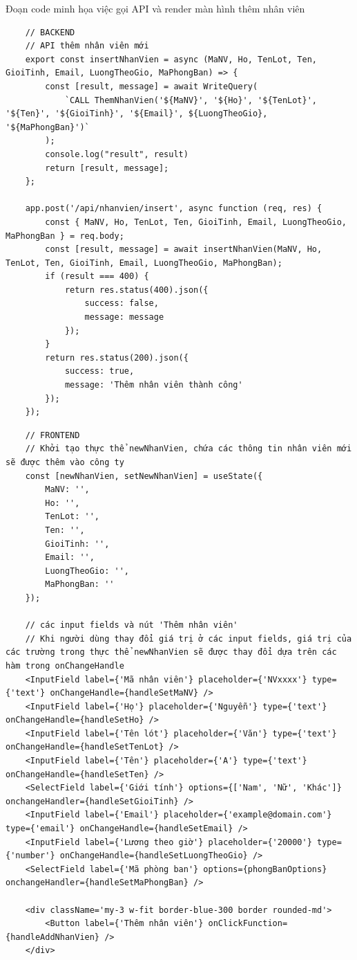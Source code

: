 \newpage
Đoạn code minh họa việc gọi API và render màn hình thêm nhân viên
\begin{verbatim}
    // BACKEND
    // API thêm nhân viên mới
    export const insertNhanVien = async (MaNV, Ho, TenLot, Ten, GioiTinh, Email, LuongTheoGio, MaPhongBan) => {
        const [result, message] = await WriteQuery(
            `CALL ThemNhanVien('${MaNV}', '${Ho}', '${TenLot}', '${Ten}', '${GioiTinh}', '${Email}', ${LuongTheoGio}, '${MaPhongBan}')`
        );
        console.log("result", result)
        return [result, message];
    };

    app.post('/api/nhanvien/insert', async function (req, res) {
        const { MaNV, Ho, TenLot, Ten, GioiTinh, Email, LuongTheoGio, MaPhongBan } = req.body;
        const [result, message] = await insertNhanVien(MaNV, Ho, TenLot, Ten, GioiTinh, Email, LuongTheoGio, MaPhongBan);
        if (result === 400) {
            return res.status(400).json({
                success: false,
                message: message
            });
        }
        return res.status(200).json({
            success: true,
            message: 'Thêm nhân viên thành công'
        });
    });
\end{verbatim}
\begin{verbatim}
    // FRONTEND
    // Khởi tạo thực thể newNhanVien, chứa các thông tin nhân viên mới sẽ được thêm vào công ty
    const [newNhanVien, setNewNhanVien] = useState({
        MaNV: '',
        Ho: '',
        TenLot: '',
        Ten: '',
        GioiTinh: '',
        Email: '',
        LuongTheoGio: '',
        MaPhongBan: ''
    });

    // các input fields và nút 'Thêm nhân viên'
    // Khi người dùng thay đổi giá trị ở các input fields, giá trị của các trường trong thực thể newNhanVien sẽ được thay đổi dựa trên các hàm trong onChangeHandle
    <InputField label={'Mã nhân viên'} placeholder={'NVxxxx'} type={'text'} onChangeHandle={handleSetMaNV} />
    <InputField label={'Họ'} placeholder={'Nguyễn'} type={'text'} onChangeHandle={handleSetHo} />
    <InputField label={'Tên lót'} placeholder={'Văn'} type={'text'} onChangeHandle={handleSetTenLot} />
    <InputField label={'Tên'} placeholder={'A'} type={'text'} onChangeHandle={handleSetTen} />
    <SelectField label={'Giới tính'} options={['Nam', 'Nữ', 'Khác']} onchangeHandler={handleSetGioiTinh} />
    <InputField label={'Email'} placeholder={'example@domain.com'} type={'email'} onChangeHandle={handleSetEmail} />
    <InputField label={'Lương theo giờ'} placeholder={'20000'} type={'number'} onChangeHandle={handleSetLuongTheoGio} />
    <SelectField label={'Mã phòng ban'} options={phongBanOptions} onchangeHandler={handleSetMaPhongBan} />
    
    <div className='my-3 w-fit border-blue-300 border rounded-md'>
        <Button label={'Thêm nhân viên'} onClickFunction={handleAddNhanVien} />
    </div>
\end{verbatim}
